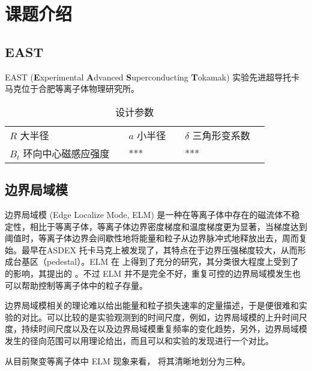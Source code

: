 \chapter{课题介绍}

\section{EAST}
EAST (\textbf{E}xperimental \textbf{A}dvanced \textbf{S}uperconducting \textbf{T}okamak) 实验先进超导托卡马克位于合肥等离子体物理研究所。

\begin{table}[htb]
    \centering
    \caption{\east 设计参数}
    \label{tab:east_parameter}
    \begin{tabularx}{\linewidth}{lXlXlX}
        \toprule[1.5pt]
        $R$ 大半径 &   & $a$ 小半径 &  & $\delta$ 三角形变系数 & \\
        $B_t$ 环向中心磁感应强度 &   & *** &  & *** & \\
        \bottomrule[1.5pt]
    \end{tabularx}
\end{table}

\section{边界局域模}
边界局域模 (Edge Localize Mode, ELM) 是一种在\Hmode 等离子体中存在的磁流体不稳定性，相比于\Lmode 等离子体，\Hmode 等离子体边界密度梯度和温度梯度更为显著，当梯度达到阈值时，等离子体边界会间歇性地将能量和粒子从边界脉冲式地释放出去，周而复始。\Hmode 最早在ASDEX 托卡马克上被发现了，其特点在于边界压强梯度较大，从而形成台基区（pedestal）。ELM 在 \ddd 上得到了充分的研究，其分类很大程度上受到了 \ddd 的影响，其提出的 。不过 ELM 并不是完全不好，重复可控的边界局域模发生也可以帮助控制等离子体中的粒子存量。



边界局域模相关的理论难以给出能量和粒子损失速率的定量描述，于是便很难和实验的对比。可以比较的是实验观测到的时间尺度，例如，边界局域模的上升时间尺度，持续时间尺度以及在以及边界局域模重复频率的变化趋势，另外，边界局域模发生的径向范围可以用理论给出，而且可以和实验的发现进行一个对比。

从目前聚变等离子体中 ELM 现象来看，\cite{zohm_edge_1996} 将其清晰地划分为三种。


